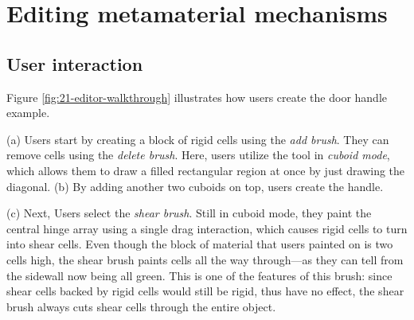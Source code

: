 


\section{Editing metamaterial mechanisms}

\subsection{User interaction}

Figure \ref{fig:21-editor-walkthrough} illustrates how users create the door handle example.

(a) Users start by creating a block of rigid cells using the \textit{add brush}. They can remove cells using the \textit{delete brush}. Here, users utilize the tool in \textit{cuboid mode}, which allows them to draw a filled rectangular region at once by just drawing the diagonal. (b) By adding another two cuboids on top, users create the handle.

(c) Next, Users select the \textit{shear brush}. Still in cuboid mode, they paint the central hinge array using a single drag interaction, which causes rigid cells to turn into shear cells. Even though the block of material that users painted on is two cells high, the shear brush paints cells all the way through---as they can tell from the sidewall now being all green. This is one of the features of this brush: since shear cells backed by rigid cells would still be rigid, thus have no effect, the shear brush always cuts shear cells through the entire object. 

